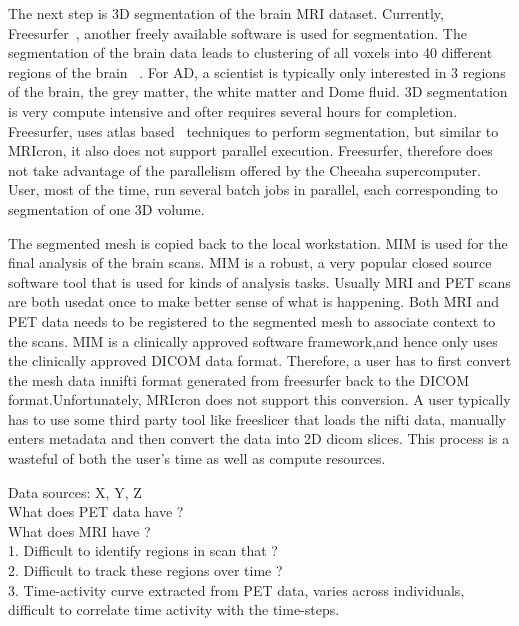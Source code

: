 \documentclass[11pt]{article}
\begin{document}
The next step is 3D segmentation of the brain MRI dataset. Currently, Freesurfer~\cite{}, another freely available software is used for segmentation. The segmentation of the brain data leads to clustering of all voxels into 40 different regions of the brain ~\cite{}. For AD, a scientist is typically only interested in 3 regions of the brain, the grey matter, the white matter and Dome fluid. 3D segmentation is very compute intensive and ofter requires several hours for completion. Freesurfer, uses atlas based~\cite{} techniques to perform segmentation, but similar to MRIcron, it also does not support parallel execution. Freesurfer, therefore does not take advantage of the parallelism offered by the Cheeaha supercomputer. User, most of the time, run several batch jobs in parallel, each corresponding to segmentation of one 3D volume.

The segmented mesh is copied back to the local workstation. MIM is used for the final analysis of the brain scans. MIM is a robust, a very popular closed source software tool that is used for kinds of analysis tasks. Usually MRI and PET scans are both usedat once to make better sense of what is happening. Both MRI and PET data needs to be registered to the segmented mesh to associate context to the scans. MIM is a clinically approved software framework,and hence only uses the clinically approved DICOM data format. Therefore, a user has to first convert the mesh data innifti format generated from freesurfer back to the DICOM format.Unfortunately, MRIcron does not support this conversion. A user typically has to use some third party tool like freeslicer that loads the nifti data, manually enters metadata and then convert the data into 2D dicom slices. This process is a wasteful of both the user's time as well as compute resources.






Data sources: X, Y, Z \\
What does PET data have ? \\
What does MRI have ? \\
1. Difficult to identify regions in scan that ? \\
2. Difficult to track these regions over time ? \\
3. Time-activity curve extracted from PET data, varies across individuals, difficult to correlate time activity with the time-steps. \\
\end{document}
